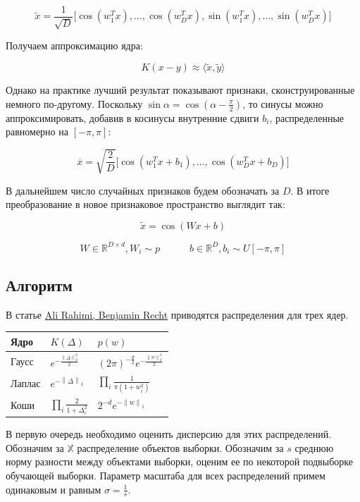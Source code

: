 \documentclass{article}
\newcommand{\bibref}[3]{#2\hyperlink{#1}{\color{blue}#3}}
\newcommand{\R}{\mathbb{R}}
\newcommand{\norm}[1]{\left\lVert#1\right\rVert}
\begin{document}
$$
\widetilde{x} = \frac{1}{\sqrt{D}} \Big[\cos \left(w_1^T x\right), \dots, \cos \left(w_D^T x\right), \sin \left(w_1^T x\right), \dots, \sin \left(w_D^T x\right) \Big]
$$

\noindent
Получаем аппроксимацию ядра:

$$
K(x - y) \approx \langle \widetilde{x}, \widetilde{y} \rangle
$$

Однако на практике лучший результат показывают признаки, сконструированные немного по-другому. Поскольку $\sin \alpha = \cos \left(\alpha - \frac{\pi}{2}\right)$, то синусы можно аппроксимировать, добавив в косинусы внутренние сдвиги $b_i$, распределенные равномерно на $[-\pi, \pi]$:

$$
\overline{x} = \sqrt{\frac{2}{D}} \Big[\cos \left(w_1^T x + b_1\right), \dots, \cos \left(w_D^T x + b_D \right)\Big]
$$

\noindent
В дальнейшем число случайных признаков будем обозначать за $D$. В итоге преобразование в новое признаковое пространство выглядит так:

$$
\widetilde{x} = \cos \left(Wx + b\right)
$$

$$
W \in \R^{D \times d}, W_i \sim p \quad\quad\quad b \in \R^D, b_i \sim U[-\pi, \pi]
$$

\subsection{Алгоритм}

В статье \bibref{kernels}{}{Ali Rahimi, Benjamin Recht} приводятся распределения для трех ядер.

\begin{table}[H]
\centering
    
\begin{tabular}{M{2cm}|M{3cm}M{3cm}}
    Ядро & $K(\Delta)$ & $p(w)$ \\
    \hline
    Гаусс & $e^{-\frac{{\norm{\Delta}^2_2}}{2}}$ & $(2\pi)^{-\frac{d}{2}}e^{-\frac{{\norm{w}^2_2}}{2}}$ \\
    Лаплас & $e^{-{\norm{\Delta}_1}}$ & $\prod_i \frac{1}{\pi \left(1 + w_i^2\right)}$ \\
    Коши & $\prod_i \frac{2}{1 + \Delta_i^2}$ & $2^{-d} e^{-{\norm{w}_1}}$
\end{tabular}

\label{tab:my_label}
\end{table}

В первую очередь необходимо оценить дисперсию для этих распределений. Обозначим за $\mathbb{X}$ распределение объектов выборки. Обозначим за $s$ среднюю норму разности между объектами выборки, оценим ее по некоторой подвыборке обучающей выборки. Параметр масштаба для всех распределений примем одинаковым и равным $\sigma = \frac{1}{s}$.
\end{document}
